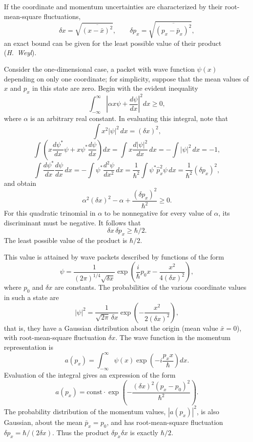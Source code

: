 If the coordinate and momentum uncertainties are characterized by their
root-mean-square fluctuations,
\[
  \delta x=\sqrt{\overline{(x-\bar x)^2}},\qquad
  \delta p_x=\sqrt{\overline{(p_x-\bar p_x)^2}},
\]
an exact bound can be given for the least possible value of their product
(\emph{H.~Weyl}).

Consider the one-dimensional case, a packet with wave function $\psi(x)$
depending on only one coordinate; for simplicity, suppose that the mean values
of $x$ and $p_x$ in this state are zero. Begin with the evident inequality
\[
  \int_{-\infty}^{\infty}
  \left|\alpha x\psi+\frac{d\psi}{dx}\right|^2dx\geq0,
\]
where $\alpha$ is an arbitrary real constant. In evaluating this integral,
note that
\[
  \int x^2|\psi|^2\,dx=(\delta x)^2,
\]
\[
  \int\left(x\frac{d\psi^*}{dx}\psi
  +x\psi^*\frac{d\psi}{dx}\right)dx
  =\int x\frac{d|\psi|^2}{dx}\,dx
  =-\int|\psi|^2\,dx=-1,
\]
\[
  \int\frac{d\psi^*}{dx}\frac{d\psi}{dx}\,dx
  =-\int\psi^*\frac{d^2\psi}{dx^2}\,dx
  =\frac{1}{\hbar^2}\int\psi^*\hat p_x^2\psi\,dx
  =\frac{1}{\hbar^2}(\delta p_x)^2,
\]
and obtain
\[
  \alpha^2(\delta x)^2-\alpha
  +\frac{(\delta p_x)^2}{\hbar^2}\geq0.
\]
For this quadratic trinomial in $\alpha$ to be nonnegative for every value of
$\alpha$, its discriminant must be negative. It follows that
\begin{equation}
  \delta x\,\delta p_x\geq\hbar/2.
  \tag{16.7}
\end{equation}
The least possible value of the product is $\hbar/2$.

This value is attained by wave packets described by functions of the form
\begin{equation}
  \psi=\frac{1}{(2\pi)^{1/4}\sqrt{\delta x}}
  \exp\left(\frac{i}{\hbar}p_0x-\frac{x^2}{4(\delta x)^2}\right),
  \tag{16.8}
\end{equation}
where $p_0$ and $\delta x$ are constants. The probabilities of the various
coordinate values in such a state are
\[
  |\psi|^2=\frac{1}{\sqrt{2\pi}\,\delta x}
  \exp\left(-\frac{x^2}{2(\delta x)^2}\right),
\]
that is, they have a Gaussian distribution about the origin (mean value
$\bar x=0$), with root-mean-square fluctuation $\delta x$. The wave function
in the momentum representation is
\[
  a(p_x)=\int_{-\infty}^{\infty}\psi(x)
  \exp\left(-i\frac{p_xx}{\hbar}\right)dx.
\]
Evaluation of the integral gives an expression of the form
\[
  a(p_x)=\mathrm{const}\cdot
  \exp\left(-\frac{(\delta x)^2(p_x-p_0)^2}{\hbar^2}\right).
\]
The probability distribution of the momentum values, $|a(p_x)|^2$, is also
Gaussian, about the mean $\bar p_x=p_0$, and has root-mean-square fluctuation
$\delta p_x=\hbar/(2\delta x)$. Thus the product
$\delta p_x\delta x$ is exactly $\hbar/2$.

